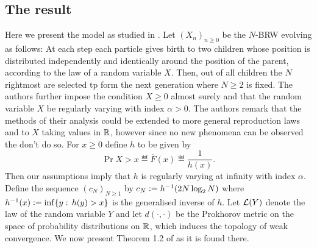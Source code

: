 \subsection{The result}\label{sec:poly_result}
Here we present the model as studied in \cite{poly_tails}. Let $(X_n)_{n \geq 0}$ be the $N$-BRW evolving as follows: At each step each particle gives birth to two children whose position is distributed independently and identically around the position of the parent, according to the law of a random variable $X$. Then, out of all children the $N$ rightmost are selected tp form the next generation where $N \geq 2$ is fixed. The authors further impose the condition $X \geq 0$ almost surely and that the random variable $X$ be regularly varying with index $\alpha > 0$. The authors remark that the methods of their analysis could be extended to more general reproduction laws and to $X$ taking values in $\R$, however since no new phenomena can be observed the don't do so. For $x \geq 0$ define $h$ to be given by
\begin{equation}
\Pr{X > x} \eqdef \overline{F}(x) \eqdef \frac{1}{h(x)}. 
\end{equation} 
Then our assumptions imply that $h$ is regularly varying at infinity with index $\alpha$. Define the sequence $(c_N)_{N \geq 1}$ by $c_N \defeq h^{-1} (2N \log_2 N)$ where $h^{-1}(x) \defeq \inf\{ y :\, h(y) > x\}$ is the generalised inverse of $h$. Let $\cal{L}(Y)$ denote the law of the random variable $Y$ and let $d(\cdot, \cdot)$ be the Prokhorov metric on the space of probability distributions on $\R$, which induces the topology of weak convergence. We now present Theorem 1.2 of \cite{poly_tails} as it is found there. 

